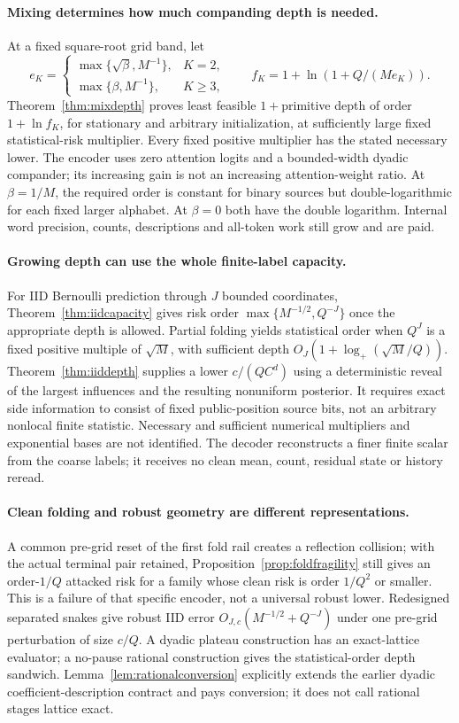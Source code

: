 \documentclass[11pt,letterpaper]{article}
\theoremstyle{definition}\newtheorem{definition}[theorem]{Definition}
\theoremstyle{remark}\newtheorem{remark}[theorem]{Remark}
\begin{document}
\paragraph{Mixing determines how much companding depth is needed.}
At a fixed square-root grid band, let
\[
 e_K=\begin{cases}\max\{\sqrt\beta,M^{-1}\},&K=2,\\
 \max\{\beta,M^{-1}\},&K\ge3,\end{cases}\qquad
 f_K=1+\ln(1+Q/(Me_K)).
\]
Theorem~\ref{thm:mixdepth} proves least feasible $1+$primitive depth of order $1+\ln f_K$, for stationary and arbitrary initialization, at sufficiently large fixed statistical-risk multiplier. Every fixed positive multiplier has the stated necessary lower. The encoder uses zero attention logits and a bounded-width dyadic compander; its increasing gain is not an increasing attention-weight ratio. At $\beta=1/M$, the required order is constant for binary sources but double-logarithmic for each fixed larger alphabet. At $\beta=0$ both have the double logarithm. Internal word precision, counts, descriptions and all-token work still grow and are paid.

\paragraph{Growing depth can use the whole finite-label capacity.}
For IID Bernoulli prediction through $J$ bounded coordinates, Theorem~\ref{thm:iidcapacity} gives risk order $\max\{M^{-1/2},Q^{-J}\}$ once the appropriate depth is allowed. Partial folding yields statistical order when $Q^J$ is a fixed positive multiple of $\sqrt M$, with sufficient depth $O_J(1+\log_+(\sqrt M/Q))$. Theorem~\ref{thm:iiddepth} supplies a lower $c/(QC^d)$ using a deterministic reveal of the largest influences and the resulting nonuniform posterior. It requires exact side information to consist of fixed public-position source bits, not an arbitrary nonlocal finite statistic. Necessary and sufficient numerical multipliers and exponential bases are not identified. The decoder reconstructs a finer finite scalar from the coarse labels; it receives no clean mean, count, residual state or history reread.

\paragraph{Clean folding and robust geometry are different representations.}
A common pre-grid reset of the first fold rail creates a reflection collision; with the actual terminal pair retained, Proposition~\ref{prop:foldfragility} still gives an order-$1/Q$ attacked risk for a family whose clean risk is order $1/Q^2$ or smaller. This is a failure of that specific encoder, not a universal robust lower. Redesigned separated snakes give robust IID error $O_{J,c}(M^{-1/2}+Q^{-J})$ under one pre-grid perturbation of size $c/Q$. A dyadic plateau construction has an exact-lattice evaluator; a no-pause rational construction gives the statistical-order depth sandwich. Lemma~\ref{lem:rationalconversion} explicitly extends the earlier dyadic coefficient-description contract and pays conversion; it does not call rational stages lattice exact.
\end{document}
